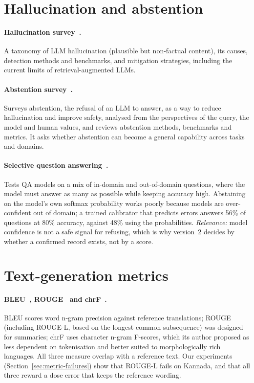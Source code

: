 \section{Hallucination and abstention}

\paragraph{Hallucination survey~\cite{huang2024hallucination}.}
A taxonomy of LLM hallucination (plausible but non-factual content), its causes, detection
methods and benchmarks, and mitigation strategies, including the current limits of
retrieval-augmented LLMs.

\paragraph{Abstention survey~\cite{wen2025abstention}.}
Surveys abstention, the refusal of an LLM to answer, as a way to reduce hallucination and
improve safety, analysed from the perspectives of the query, the model and human values, and
reviews abstention methods, benchmarks and metrics. It asks whether abstention can become a
general capability across tasks and domains.

\paragraph{Selective question answering~\cite{kamath2020selective}.}
Tests QA models on a mix of in-domain and out-of-domain questions, where the model must answer
as many as possible while keeping accuracy high. Abstaining on the model's own softmax
probability works poorly because models are over-confident out of domain; a trained
calibrator that predicts errors answers 56\% of questions at 80\% accuracy, against 48\%
using the probabilities. \emph{Relevance:} model confidence is not a safe signal for refusing,
which is why version~2 decides by whether a confirmed record exists, not by a score.

\section{Text-generation metrics}

\paragraph{BLEU~\cite{papineni2002bleu}, ROUGE~\cite{lin2004rouge} and chrF~\cite{popovic2015chrf}.}
BLEU scores word n-gram precision against reference translations; ROUGE (including ROUGE-L,
based on the longest common subsequence) was designed for summaries; chrF uses character
n-gram F-scores, which its author proposed as less dependent on tokenisation and better
suited to morphologically rich languages. All three measure overlap with a reference text.
Our experiments (Section~\ref{sec:metric-failures}) show that ROUGE-L fails on Kannada, and
that all three reward a dose error that keeps the reference wording.

